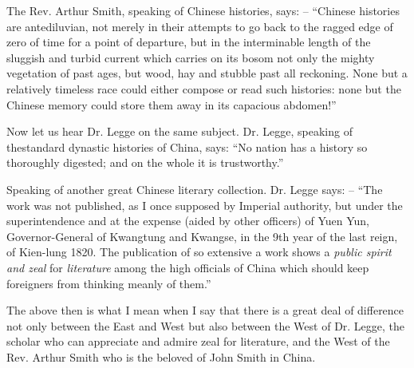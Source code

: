 The Rev. Arthur Smith, speaking of Chinese histories, says:
-- ``Chinese histories are antediluvian,
not merely in their attempts to go back to the ragged edge of zero of time for a point of departure,
but in the interminable length of the sluggish and turbid current which carries on its bosom not only the mighty vegetation of past ages,
but wood, hay and stubble past all reckoning.
None but a relatively timeless race could either compose or read such histories:
none but the Chinese memory could store them away in its capacious abdomen!''

Now let us hear Dr. Legge on the same subject. Dr. Legge, speaking of thestandard dynastic histories of China, says:
``No nation has a history so thoroughly digested; and on the whole it is trustworthy.''

Speaking of another great Chinese literary collection.
Dr. Legge says: --
``The work was not published, as I once supposed by Imperial authority, but under the superintendence and at the expense (aided by other officers) of Yuen Yun,
Governor-General of Kwangtung and Kwangse, in the 9th year of the last reign,
of Kien-lung 1820.
The publication of so extensive a work shows a \emph{public spirit and zeal} for \emph{literature}
among the high officials of China which should keep foreigners from thinking meanly of them.''

The above then is what I mean when I say that there is a great deal of difference
not only between the East and West but also between the West of Dr. Legge,
the scholar who can appreciate and admire zeal for literature,
and the West of the Rev. Arthur Smith who is the beloved of John Smith in China.

